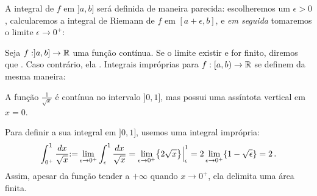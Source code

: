 A integral de $f$ em $]a,b]$ será definida de maneira parecida: 
escolheremos um $\epsilon>0$, calcularemos a integral
de Riemann de $f$ em $[a+\epsilon,b]$,
e \emph{em seguida} tomaremos o limite $\epsilon\to 0^+$:

\begin{defin}
Seja $f:]a,b]\to \mathbb{R}$ uma função contínua. Se o limite 
existir e for finito, diremos que . Caso contrário, ela .
Integrais impróprias para $f:[a,b)\to \mathbb{R}$ se definem da mesma maneira:
\end{defin}

\begin{ex}
A função $\frac{1}{\sqrt{x}}$ é contínua no intervalo $]0,1]$, mas possui uma
assíntota vertical em $x=0$. 
\begin{center}
\begin{bmlimage}\end{bmlimage}
\end{center}
Para definir a sua integral em $]0,1]$, usemos uma integral imprópria:
$$
\int_{0^+}^1\frac{dx}{\sqrt{x}}{:=}\lim_{\epsilon\to
0^+}\int_{\epsilon}^1\frac{dx}{\sqrt{x}}=
\lim_{\epsilon\to 0^+}\bigl\{2\sqrt{x}\bigr\}\Big|_\epsilon^1
=2\lim_{\epsilon\to 0^+}\{1-\sqrt{\epsilon}\}=2\,.
$$
Assim, apesar da função tender a $+\infty$ 
quando $x\to 0^+$, ela delimita uma área finita.
\end{ex}

